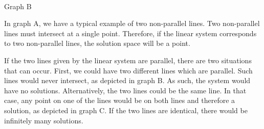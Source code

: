 \begin{example}
\begin{center}
{\begin{minipage}{0.3\textwidth}
\begin{center}
\\
					{\scriptsize Graph B}
				\end{center}
			\end{minipage}
		}
	\end{center}
	
	In graph A, we have a typical example of two non-parallel lines. Two non-parallel lines must intersect at a single point. Therefore, if the linear system corresponds to two non-parallel lines, the solution space will be a point.
	
	If the two lines given by the linear system are parallel, there are two situations that can occur. First, we could have two different lines which are parallel. Such lines would never intersect, as depicted in graph B. As such, the system would have no solutions. Alternatively, the two lines could be the same line. In that case, any point on one of the lines would be on both lines and therefore a solution, as depicted in graph C. If the two lines are identical, there would be infinitely many solutions. 

\end{example}

